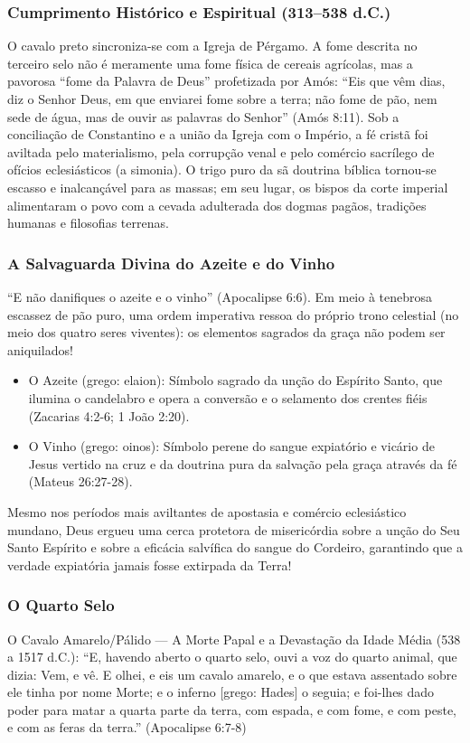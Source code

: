 \documentclass[11pt,a4paper,openany]{book}
\begin{document}
\subsubsection*{Cumprimento Histórico e Espiritual (313–538 d.C.)}
O cavalo preto sincroniza-se com a Igreja de Pérgamo. A fome descrita no terceiro selo não é meramente uma fome física de cereais agrícolas, mas a pavorosa ``fome da Palavra de Deus'' profetizada por Amós: ``Eis que vêm dias, diz o Senhor Deus, em que enviarei fome sobre a terra; não fome de pão, nem sede de água, mas de ouvir as palavras do Senhor'' (Amós 8:11).
Sob a conciliação de Constantino e a união da Igreja com o Império, a fé cristã foi aviltada pelo materialismo, pela corrupção venal e pelo comércio sacrílego de ofícios eclesiásticos (a simonia). O trigo puro da sã doutrina bíblica tornou-se escasso e inalcançável para as massas; em seu lugar, os bispos da corte imperial alimentaram o povo com a cevada adulterada dos dogmas pagãos, tradições humanas e filosofias terrenas.


\subsubsection*{A Salvaguarda Divina do Azeite e do Vinho}
``E não danifiques o azeite e o vinho'' (Apocalipse 6:6).
Em meio à tenebrosa escassez de pão puro, uma ordem imperativa ressoa do próprio trono celestial (no meio dos quatro seres viventes): os elementos sagrados da graça não podem ser aniquilados!
\begin{itemize}
  \item O Azeite (grego: elaion): Símbolo sagrado da unção do Espírito Santo, que ilumina o candelabro e opera a conversão e o selamento dos crentes fiéis (Zacarias 4:2-6; 1 João 2:20).
  \item O Vinho (grego: oinos): Símbolo perene do sangue expiatório e vicário de Jesus vertido na cruz e da doutrina pura da salvação pela graça através da fé (Mateus 26:27-28).
\end{itemize}

Mesmo nos períodos mais aviltantes de apostasia e comércio eclesiástico mundano, Deus ergueu uma cerca protetora de misericórdia sobre a unção do Seu Santo Espírito e sobre a eficácia salvífica do sangue do Cordeiro, garantindo que a verdade expiatória jamais fosse extirpada da Terra!


\subsubsection*{O Quarto Selo}
O Cavalo Amarelo/Pálido — A Morte Papal e a Devastação da Idade Média (538 a 1517 d.C.):
``E, havendo aberto o quarto selo, ouvi a voz do quarto animal, que dizia: Vem, e vê. E olhei, e eis um cavalo amarelo, e o que estava assentado sobre ele tinha por nome Morte; e o inferno [grego: Hades] o seguia; e foi-lhes dado poder para matar a quarta parte da terra, com espada, e com fome, e com peste, e com as feras da terra.'' (Apocalipse 6:7-8)
\end{document}
